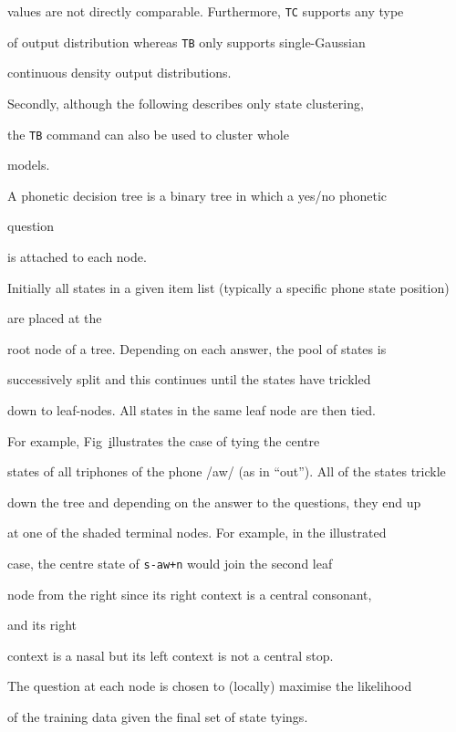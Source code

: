 values are not directly comparable.  Furthermore, \texttt{TC} supports any type


of output distribution whereas \texttt{TB} only supports single-Gaussian


continuous density output distributions.


Secondly, although the following describes only state clustering, 


the \texttt{TB} command can also be used to cluster whole


models.





A phonetic decision tree is a binary tree in which a yes/no phonetic 


question


is attached to each node.  


Initially all states in a given item list (typically a specific phone state position)


are placed at the


root node of a tree. Depending on each answer, the pool of states is


successively split and this continues until the states have trickled


down to leaf-nodes.  All states in the same leaf node are then tied. 


For example, Fig~\href{f:qstree} illustrates the case of tying the centre


states of all triphones of the phone /aw/ (as in ``out'').  All of the states trickle


down the tree and depending on the answer to the questions, they end up


at one of the shaded terminal nodes.   For example, in the illustrated


case, the centre state of \texttt{s-aw+n} would join the second leaf


node from the right since its right context is a central consonant,


and its right


context is a nasal  but its left context is not a central stop.





The question at each node is chosen to (locally) maximise the likelihood


of the training data given the final set of state tyings. 


